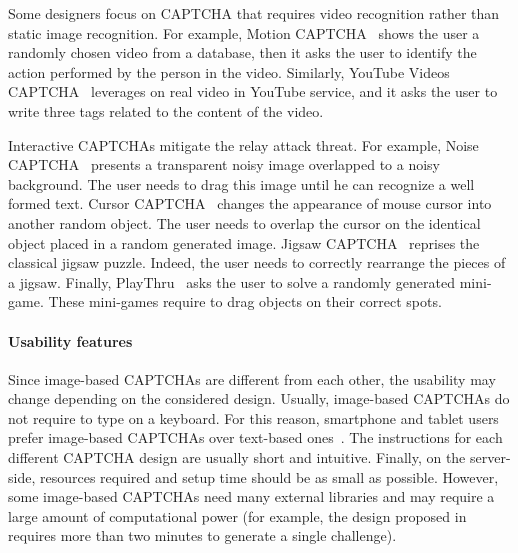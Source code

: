 \documentclass[conference]{IEEEtran}
\begin{document}
Some designers focus on CAPTCHA that requires video recognition rather than static image recognition.
For example, {Motion CAPTCHA}~\cite{shirali2008motion} shows the user a randomly chosen video from a database, then it asks the user to identify the action performed by the person in the video.
Similarly, {YouTube Videos CAPTCHA}~\cite{kluever2009balancing} leverages on real video in YouTube service, and it asks the user to write three tags related to the content of the video.

Interactive CAPTCHAs mitigate the relay attack threat.
For example, {Noise CAPTCHA}~\cite{okada2012new} presents a transparent noisy image overlapped to a noisy background.
The user needs to drag this image until he can recognize a well formed text. 
{Cursor CAPTCHA}~\cite{thomas2013cursor} changes the appearance of mouse cursor into another random object.
The user needs to overlap the cursor on the identical object placed in a random generated image.
{Jigsaw CAPTCHA}~\cite{gao2010novel} reprises the classical jigsaw puzzle.
Indeed, the user needs to correctly rearrange the pieces of a jigsaw.
Finally, {PlayThru}~\cite{areyouahuman} asks the user to solve a randomly generated mini-game.
These mini-games require to drag objects on their correct spots.



\paragraph{Usability features}
Since image-based CAPTCHAs are different from each other, the usability may change depending on the considered design.
Usually, image-based CAPTCHAs do not require to type on a keyboard.
For this reason, smartphone and tablet users prefer image-based CAPTCHAs over text-based ones~\cite{reynaga2013usability}.
The instructions for each different CAPTCHA design are usually short and intuitive. Finally, on the server-side, resources required and setup time should be as small as possible. However, some image-based CAPTCHAs need many external libraries and may require a large amount of computational power (for example, the design proposed in~\cite{zhu2010attacks} requires more than two minutes to generate a single challenge).
\end{document}
